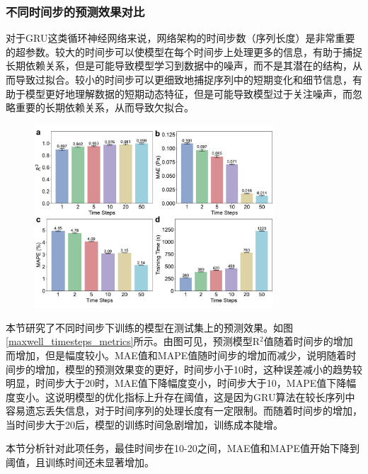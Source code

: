 \subsubsection{不同时间步的预测效果对比}
对于GRU这类循环神经网络来说，网络架构的时间步数（序列长度）是非常重要的超参数。较大的时间步可以使模型在每个时间步上处理更多的信息，有助于捕捉长期依赖关系，但是可能导致模型学习到数据中的噪声，而不是其潜在的结构，从而导致过拟合。较小的时间步可以更细致地捕捉序列中的短期变化和细节信息，有助于模型更好地理解数据的短期动态特征，但是可能导致模型过于关注噪声，而忽略重要的长期依赖关系，从而导致欠拟合。
\begin{figure}[htbp]
  \centering
  \includegraphics[width=0.8\textwidth]{Fig/Maxwell_timesteps_metrics.pdf}
\end{figure}
本节研究了不同时间步下训练的模型在测试集上的预测效果。如图\ref{maxwell_timesteps_metrics}所示。由图可见，预测模型R$^2$值随着时间步的增加而增加，但是幅度较小。MAE值和MAPE值随时间步的增加而减少，说明随着时间步的增加，模型的预测效果变的更好，时间步小于10时，这种误差减小的趋势较明显，时间步大于20时，MAE值下降幅度变小，时间步大于10，MAPE值下降幅度变小。这说明模型的优化指标上升存在阈值，这是因为GRU算法在较长序列中容易遗忘丢失信息，对于时间序列的处理长度有一定限制。而随着时间步的增加，当时间步大于20后，模型的训练时间急剧增加，训练成本陡增。

本节分析针对此项任务，最佳时间步在10-20之间，MAE值和MAPE值开始下降到阈值，且训练时间还未显著增加。


